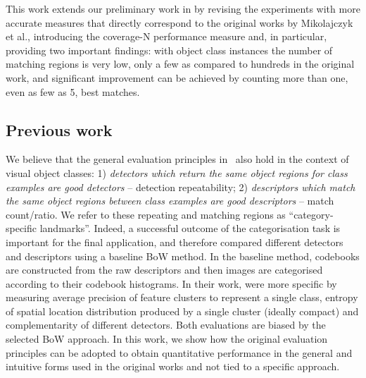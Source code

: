 \documentclass[preprint,authoryear,review]{elsarticle}
\newcommand{\commentNK}[1]{{\bf NK: #1}}
\begin{document}

This work extends our preliminary work in \cite{LanKanKam:2012} by revising the
experiments with more accurate measures that directly correspond to the original works
by Mikolajczyk et al., introducing the coverage-N performance measure and, in
particular, providing two important findings: with object class instances the
number of matching regions is very low, only a few as compared to hundreds in the
original work, and significant improvement can be achieved by counting more than one,
even as few as 5, best matches.


%
\subsection{Previous work}
%


We believe that the general evaluation principles in~\cite{MikSch:2005,MikTuySch:2005} also hold in
the context of visual object classes: 1) \textit{detectors which return the same object regions for class
examples are good detectors} -- detection repeatability; 2)
\textit{descriptors which match the same object regions between class examples are good descriptors} -- match count/ratio. We refer to these repeating and matching regions as
``category-specific landmarks''. Indeed, a successful outcome of the categorisation task is important
for the final application, and therefore \cite{ZhaMarLaz:2006} compared different
detectors and descriptors using a baseline BoW method. In the baseline method, codebooks are constructed from
the raw descriptors and then images are categorised according to their codebook histograms.
In their work, \cite{MikLeiSch:2005}
were more specific by measuring average precision of feature clusters to represent a single class,
entropy of spatial location distribution produced by a single cluster (ideally compact) and complementarity
of different detectors. Both evaluations are biased by
the selected BoW approach. In this work, we show how the original evaluation principles can 
be adopted to obtain quantitative performance in the general and intuitive forms used in the original
works and not tied to a specific approach.
\end{document}
